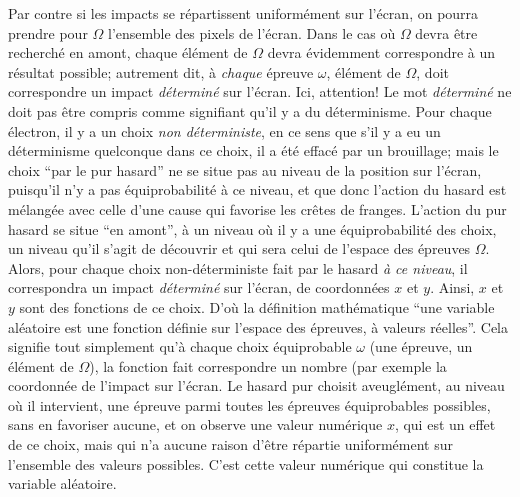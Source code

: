 Par contre si les impacts se r\'epartissent uniform\'ement sur l'\'ecran,
on pourra prendre pour $\Omega$ l'ensemble des pixels de l'\'ecran. Dans
le cas o\`u $\Omega$ devra \^etre  recherch\'e en amont, chaque
\'el\'ement de $\Omega$ devra \'evidemment correspondre \`a un
r\'esultat possible; autrement dit, \`a {\it chaque} \'epreuve $\omega$,
\'el\'ement de $\Omega$, doit correspondre un impact {\it d\'etermin\'e}
sur l'\'ecran. Ici, attention! Le mot {\it d\'etermin\'e} ne doit  pas \^etre
compris comme signifiant qu'il y a du d\'eterminisme. Pour chaque
\'electron, il y a un choix {\it non d\'eterministe}, en ce sens que s'il y a
eu un d\'eterminisme quelconque dans ce choix, il a \'et\'e effac\'e
par un brouillage; mais le choix ``par le pur hasard'' ne se situe pas au
niveau de la position sur l'\'ecran, puisqu'il n'y a pas \'equiprobabilit\'e
\`a ce niveau, et que donc l'action du hasard est m\'elang\'ee avec celle
d'une cause qui favorise les cr\^etes de franges. L'action du pur hasard se
situe ``en amont'', \`a un niveau o\`u il y a une \'equiprobabilit\'e des
choix, un niveau qu'il s'agit de d\'ecouvrir et qui sera celui de l'espace
des \'epreuves $\Omega$. Alors, pour chaque choix non-d\'eterministe
fait par le hasard {\it \`a ce niveau}, il correspondra un impact {\it
d\'etermin\'e} sur l'\'ecran, de coordonn\'ees $x$ et $y$. Ainsi, $x$ et $y$
sont des fonctions de ce choix.   
\medskip  
D'o\`u la d\'efinition math\'ematique ``une variable al\'eatoire est une 
fonction d\'efinie sur l'espace des \'epreuves, \`a valeurs r\'eelles''. Cela
signifie tout simplement qu'\`a chaque choix \'equiprobable $\omega$ 
(une \'epreuve, un \'el\'ement de $\Omega$), la fonction fait correspondre
un nombre (par exemple la coordonn\'ee de l'impact sur l'\'ecran. Le 
hasard pur choisit aveugl\'ement, au  niveau o\`u il intervient, une
\'epreuve parmi toutes les \'epreuves \'equiprobables possibles, sans en
favoriser aucune, et on observe une valeur num\'erique $x$, qui est  un
effet de ce choix, mais qui n'a aucune raison d'\^etre r\'epartie
uniform\'ement sur l'ensemble des valeurs possibles. C'est cette valeur
num\'erique qui constitue la variable al\'eatoire. 

\bigskip

